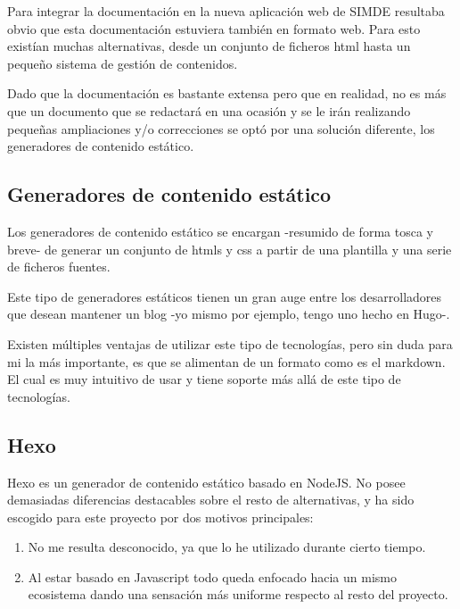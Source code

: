 Para integrar la documentación en la nueva aplicación web de SIMDE resultaba obvio que esta documentación
estuviera también en formato web. Para esto existían muchas alternativas, desde un conjunto de ficheros
html hasta un pequeño sistema de gestión de contenidos. 

\bigskip
Dado que la documentación es bastante extensa pero que en realidad, no es más que un documento 
que se redactará en una ocasión y se le irán realizando pequeñas ampliaciones y/o correcciones
se optó por una solución diferente, los generadores de contenido estático.

\subsection{Generadores de contenido estático}

Los generadores de contenido estático se encargan -resumido de forma tosca y breve- de generar 
un conjunto de htmls y css a partir de una plantilla y una serie de ficheros fuentes. 

\bigskip
Este tipo de generadores estáticos tienen un gran auge entre los desarrolladores que desean 
mantener un blog -yo mismo por ejemplo, tengo uno hecho en Hugo-. 

\bigskip 
Existen múltiples ventajas de utilizar este tipo de tecnologías, pero sin duda para mi la más
importante, es que se alimentan de un formato como es el markdown. El cual es muy intuitivo de 
usar y tiene soporte más allá de este tipo de tecnologías. 

\subsection{Hexo}

Hexo es un generador de contenido estático basado en NodeJS. No posee demasiadas diferencias destacables
sobre el resto de alternativas, y ha sido escogido para este proyecto por dos motivos principales:

\begin{enumerate}

\item No me resulta desconocido, ya que lo he utilizado durante cierto tiempo.

\item Al estar basado en Javascript todo queda enfocado hacia un mismo ecosistema dando una sensación
más uniforme respecto al resto del proyecto.

\end{enumerate}